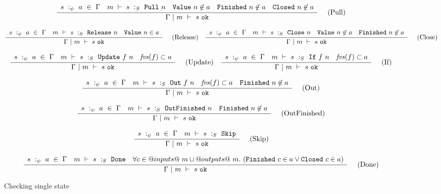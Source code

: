 \begin{figure*}

$$
\frac {\displaystyle 
    \begin{array}{lcccr}
        s~:_\psi~ a ~\in~ \Gamma                    &
        m ~\vdash~ s ~:_S~ \mathtt{Pull}~n    &
        \mathtt{Value}~n \not\in a             &
        \mathtt{Finished}~n \not\in a          &
        \mathtt{Closed}~n \not\in a
    \end{array}
} {\displaystyle  
    \Gamma ~|~ m ~\vdash~ s~\mathtt{ok}
} \ 
\quad
\textrm{(Pull)}
$$

$$
\frac {\displaystyle 
    \begin{array}{lcr}
        s~:_\psi~ a ~\in~ \Gamma                        &
        m ~\vdash~ s ~:_S~ \mathtt{Release}~n    &
        \mathtt{Value}~n \in a
    \end{array}
} {\displaystyle  
    \Gamma ~|~ m ~\vdash~ s~\mathtt{ok}
} \ 
\quad
\textrm{(Release)}
\quad
\frac {\displaystyle 
    \begin{array}{lccr}
        s~:_\psi~ a ~\in~ \Gamma                    &
        m ~\vdash~ s ~:_S~ \mathtt{Close}~n    &
        \mathtt{Value}~n \not\in a             &
        \mathtt{Finished}~n \not\in a
    \end{array}
} {\displaystyle  
    \Gamma ~|~ m ~\vdash~ s~\mathtt{ok}
} \ 
\quad
\textrm{(Close)}
$$

$$
\frac {\displaystyle 
    \begin{array}{lcr}
        s~:_\psi~ a ~\in~ \Gamma                        &
        m ~\vdash~ s ~:_S~ \mathtt{Update}~f~n    &
        \mathit{fvs}(f) \subset a
    \end{array}
} {\displaystyle  
    \Gamma ~|~ m ~\vdash~ s~\mathtt{ok}
} \ 
\quad
\textrm{(Update)}
\quad
\frac {\displaystyle 
    \begin{array}{lcr}
        s~:_\psi~ a ~\in~ \Gamma                        &
        m ~\vdash~ s ~:_S~ \mathtt{If}~f~n    &
        \mathit{fvs}(f) \subset a
    \end{array}
} {\displaystyle  
    \Gamma ~|~ m ~\vdash~ s~\mathtt{ok}
} \ 
\quad
\textrm{(If)}
$$

$$
\frac {\displaystyle 
    \begin{array}{lccr}
        s~:_\psi~ a ~\in~ \Gamma                      &
        m ~\vdash~ s ~:_S~ \mathtt{Out}~f~n    &
        \mathit{fvs}(f) \subset a                   &
        \mathtt{Finished}~n \not\in a
    \end{array}
} {\displaystyle  
    \Gamma ~|~ m ~\vdash~ s~\mathtt{ok}
} \ 
\quad
\textrm{(Out)}
$$

$$
\frac {\displaystyle 
    \begin{array}{lcr}
        s~:_\psi~ a ~\in~ \Gamma                            &
        m ~\vdash~ s ~:_S~ \mathtt{OutFinished}~n     &
        \mathtt{Finished}~n    \not\in a
    \end{array}
} {\displaystyle  
    \Gamma ~|~ m ~\vdash~ s~\mathtt{ok}
} \ 
\quad
\textrm{(OutFinished)}
$$

$$
\frac {\displaystyle 
    \begin{array}{lr}
        s~:_\psi~ a ~\in~ \Gamma                &
        m ~\vdash~ s ~:_S~ \mathtt{Skip}
    \end{array}
} {\displaystyle  
    \Gamma ~|~ m ~\vdash~ s~\mathtt{ok}
} \ 
\quad
\textrm{(Skip)}
$$

$$
\frac {\displaystyle 
    \begin{array}{lcr}
        s~:_\psi~ a ~\in~ \Gamma                &
        m ~\vdash~ s ~:_S~ \mathtt{Done}    &
        \forall c \in @inputs@~m \cup @outputs@~m.~(\mathtt{Finished}~c \in a \vee \mathtt{Closed}~c \in a)
    \end{array}
} {\displaystyle  
    \Gamma ~|~ m ~\vdash~ s~\mathtt{ok}
} \ 
\quad
\textrm{(Done)}
$$

\caption{Checking single state}
\label{fig:inv:checking}
\end{figure*}

